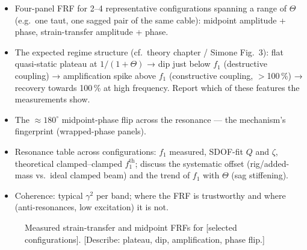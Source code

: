 \begin{itemize}
  \item Four-panel FRF for 2–4 representative configurations spanning a range
    of $\Theta$ (e.g.\ one taut, one sagged pair of the same cable):
    midpoint amplitude + phase, strain-transfer amplitude + phase.
  \item The expected regime structure (cf.\ theory chapter / Simone Fig.~3):
    flat quasi-static plateau at $1/(1+\Theta)$ → dip just below $f_1$
    (destructive coupling) → amplification spike above $f_1$ (constructive
    coupling, $>$100\,\%) → recovery towards 100\,\% at high frequency.
    Report which of these features the measurements show.
  \item The $\approx 180^\circ$ midpoint-phase flip across the resonance —
    the mechanism's fingerprint (wrapped-phase panels).
  \item Resonance table across configurations: $f_1$ measured, SDOF-fit $Q$
    and $\zeta$, theoretical clamped–clamped $f_1^\mathrm{th}$; discuss the
    systematic offset (rig/added-mass vs.\ ideal clamped beam) and the trend
    of $f_1$ with $\Theta$ (sag stiffening).
  \item Coherence: typical $\gamma^2$ per band; where the FRF is trustworthy
    and where (anti-resonances, low excitation) it is not.
\end{itemize}

\begin{figure}[htb]
  \centering
  \caption{Measured strain-transfer and midpoint FRFs for [selected
    configurations]. [Describe: plateau, dip, amplification, phase flip.]}
  \label{fig:res:frf}
\end{figure}

\begin{table}[htb]
  \centering
  \caption{Resonance characterisation: measured $f_1$, quality factor $Q$,
    damping $\zeta$, and theoretical clamped-beam $f_1^\mathrm{th}$ per
    configuration. [From freqdomain resonance summary.]}
  \label{tab:res:resonance}
\end{table}

